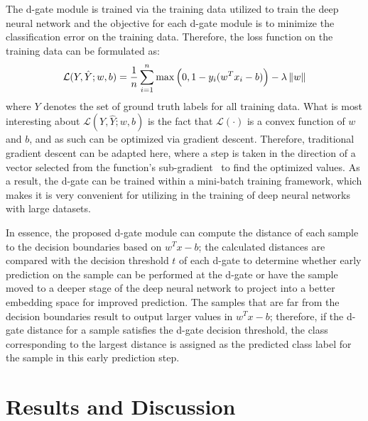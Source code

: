 \documentclass{article}
\newcommand\norm[1]{\left\lVert#1\right\rVert}
\begin{document}
The d-gate module is trained via the training data utilized to train the deep neural network and the objective for each d-gate module is to minimize the classification error on the training data. Therefore, the loss function on the training data can be formulated as:
\vspace{-0.35 cm}
\begin{align}
\vspace{-0.6 cm}
  \mathcal{L}(Y,\hat{Y};w,b) = \frac{1}{n} \sum_{i=1}^n \max\Big(0,1 - y_i(w^Tx_i-b)\Big) - \lambda \norm{w}
  \vspace{-1 cm}
\end{align}
where $Y$ denotes the set of ground truth labels for all training data. What is most interesting about $\mathcal{L}(Y,\hat{Y};w,b)$ is the fact that $\mathcal{L}(\cdot)$ is a convex function of $w$ and $b$, and as such can be optimized via gradient descent.  Therefore, traditional gradient descent can be adapted here, where a step is taken in the direction of a vector selected from the function's sub-gradient~\cite{shalev2011pegasos} to find the optimized values. As a result, the d-gate can be trained within a mini-batch training framework, which makes it is very convenient for utilizing in the training of deep neural networks with large datasets.

In essence, the proposed d-gate module can compute the distance of each sample to the decision boundaries based on $w^Tx-b$;  the calculated distances are compared with the decision threshold $t$ of each d-gate to determine whether early prediction on the sample can be performed at the d-gate or have the sample moved to a deeper stage of the deep neural network to project into a better embedding space for improved prediction. The samples that are far from the decision boundaries result to output larger values in $w^Tx-b$; therefore, if the d-gate distance for a sample satisfies the d-gate decision threshold, the class corresponding to the largest distance is assigned as the predicted class label for the sample in this early prediction step.

\vspace{-0.4 cm}
\section{Results and Discussion}
\label{sec:exp}
\vspace{-0.5 cm}
\end{document}
